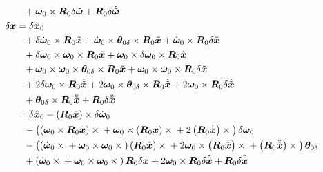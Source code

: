 \documentclass[10pt,dvips,fleqn,subeqn]{report}
\newcommand{\T}[1]{\bm{#1}}
\newcommand{\TT}[1]{\bm{#1}}
\begin{document}
\begin{subequations}
\begin{align}
		\nonumber \\
		&\hphantom{=}+ \T{\omega}_0 \times \TT{R}_0 \delta\tilde{\T{\omega}}
		+ \TT{R}_0 \delta\dot{\tilde{\T{\omega}}} \\
	\delta\ddot{\T{x}} &= \delta\ddot{\T{x}}_0
		\nonumber \\
		&\hphantom{=}+ \delta\dot{\T{\omega}}_0 \times \TT{R}_0 \tilde{\T{x}}
		+ \dot{\T{\omega}}_0 \times \T{\theta}_{0\delta}\times\TT{R}_0 \tilde{\T{x}}
		+ \dot{\T{\omega}}_0 \times \TT{R}_0 \delta\tilde{\T{x}}
		\nonumber \\
		&\hphantom{=}+ \delta\T{\omega}_0 \times \T{\omega}_0 \times \TT{R}_0 \tilde{\T{x}}
		+ \T{\omega}_0 \times \delta\T{\omega}_0 \times \TT{R}_0 \tilde{\T{x}}
		\nonumber \\
		&\hphantom{=}+ \T{\omega}_0 \times \T{\omega}_0 \times \T{\theta}_{0\delta}\times\TT{R}_0 \tilde{\T{x}}
		+ \T{\omega}_0 \times \T{\omega}_0 \times \TT{R}_0 \delta\tilde{\T{x}}
		\nonumber \\
		&\hphantom{=}+ 2 \delta\T{\omega}_0 \times \TT{R}_0 \dot{\tilde{\T{x}}}
		+ 2 \T{\omega}_0 \times \T{\theta}_{0\delta}\times\TT{R}_0 \dot{\tilde{\T{x}}}
		+ 2 \T{\omega}_0 \times \TT{R}_0 \delta\dot{\tilde{\T{x}}}
		\nonumber \\
		&\hphantom{=}+ \T{\theta}_{0\delta}\times\TT{R}_0 \ddot{\tilde{\T{x}}}
		+ \TT{R}_0 \delta\ddot{\tilde{\T{x}}}
		\nonumber \\
	&= \delta\ddot{\T{x}}_0 - \plbr{\TT{R}_0 \tilde{\T{x}}} \times \delta\dot{\T{\omega}}_0
		\nonumber \\
		&\hphantom{=}- \plbr{
			\plbr{\T{\omega}_0 \times \TT{R}_0 \tilde{\T{x}}} \times{}
			+ \T{\omega}_0 \times \plbr{\TT{R}_0 \tilde{\T{x}}} \times{}
			+ 2 \plbr{\TT{R}_0 \dot{\tilde{\T{x}}}} \times{}
		} \delta\T{\omega}_0
		\nonumber \\
		&\hphantom{=}- \plbr{
			\plbr{
				\dot{\T{\omega}}_0 \times{}
				+ \T{\omega}_0 \times \T{\omega}_0 \times{}
			} \plbr{\TT{R}_0 \tilde{\T{x}}} \times{}
			+ 2 \T{\omega}_0 \times \plbr{\TT{R}_0 \dot{\tilde{\T{x}}}} \times{}
			+ \plbr{\TT{R}_0 \ddot{\tilde{\T{x}}}} \times{}
		}\T{\theta}_{0\delta}
		\nonumber \\
		&\hphantom{=}+ \plbr{
			\dot{\T{\omega}}_0 \times{}
			+ \T{\omega}_0 \times \T{\omega}_0 \times{}
		} \TT{R}_0 \delta\tilde{\T{x}}
%
		+ 2 \T{\omega}_0 \times \TT{R}_0 \delta\dot{\tilde{\T{x}}}
%
		+ \TT{R}_0 \delta\ddot{\tilde{\T{x}}}
\end{align}
\end{subequations}
\end{document}
